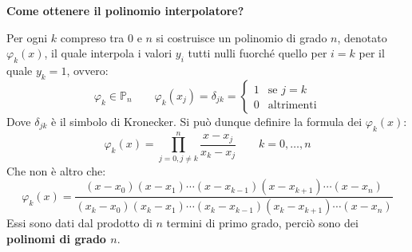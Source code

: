 \begin{flushleft}
	\textcolor{Green3}{ \textbf{Come ottenere il polinomio interpolatore?}}
\end{flushleft}
Per ogni $k$ compreso tra $0$ e $n$ si costruisce un polinomio di grado $n$, denotato $\varphi_{k}\left(x\right)$, il quale interpola i valori $y_{i}$ tutti nulli fuorché quello per $i=k$ per il quale $y_{k} = 1$, ovvero:
\begin{equation*}
	\varphi_{k} \in \mathbb{P}_{n} \hspace{2em} \varphi_{k}\left(x_{j}\right) = \delta_{jk} = \begin{cases}
		1 & \text{se } j=k \\
		0 & \text{altrimenti}
	\end{cases}
\end{equation*}
Dove $\delta_{jk}$ è il simbolo di Kronecker. Si può dunque definire la formula dei  $\varphi_{k}\left(x\right)$:
\begin{equation}
	\varphi_{k}\left(x\right) = \displaystyle\prod_{j=0, j \ne k}^{n} \dfrac{x-x_{j}}{x_{k}-x_{j}} \hspace{2em} k = 0, \dots, n
\end{equation}
Che non è altro che:
\begin{equation*}
	\varphi_{k}\left(x\right) = \dfrac{
		\left(x-x_{0}\right)\left(x-x_{1}\right) \cdots
		\left(x-x_{k-1}\right)\left(x-x_{k+1}\right) \cdots
		\left(x-x_{n}\right)
	}{
		\left(x_{k}-x_{0}\right)\left(x_{k}-x_{1}\right) \cdots \left(x_{k}-x_{k-1}\right)\left(x_{k}-x_{k+1}\right) \cdots
		\left(x-x_{n}\right)
	}
\end{equation*}
Essi sono dati dal prodotto di $n$ termini di primo grado, perciò sono dei \textbf{polinomi di grado $n$}.

